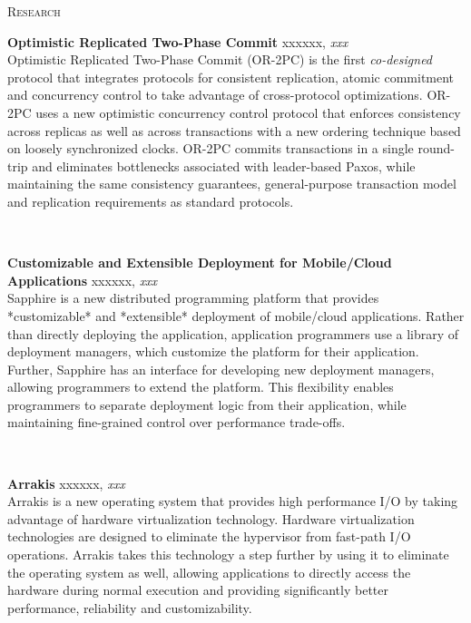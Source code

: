 \documentclass[10pt,times]{report}
\newlength{\sectiongap}
\newlength{\entrygap}
\newlength{\sectioncolwidth}
\newlength{\colgap}
\newlength{\stuffwidth}
\def\ifEqString#1#2{\def\testa{#1}\def\testb{#2}%
  \ifx\testa\testb}
\newenvironment{rtable}{
  \begin{minipage}{\textwidth}
  }{
  \end{minipage}
}
\newenvironment{rentry}[3][xxx]{
  \begin{minipage}[t]{\hsize}
    \textbf{#2}\ifEqString{#1}{xxx}\relax\else, \textit{#1}\fi
    \hspace{\stretch{1}} #3 \\
  }{
    \removelastskip
  \end{minipage}
  \\[\entrygap]  %
}
\newenvironment{rsection}[1]{
  \begin{minipage}[t]{\sectioncolwidth}
    \textsc{#1}
  \end{minipage}
  \hspace{\colgap}
  \begin{minipage}[t]{\stuffwidth}
  }{
    \removelastskip
  \end{minipage}
  \\[\sectiongap]
}
\begin{document}
\begin{rtable}
  \begin{rsection}{Research}
    \begin{rentry}{Optimistic Replicated Two-Phase Commit}{}
      Optimistic Replicated Two-Phase Commit (OR-2PC) is the first
      \emph{co-designed} protocol that integrates protocols for
      consistent replication, atomic commitment and concurrency
      control to take advantage of cross-protocol
      optimizations. OR-2PC uses a new optimistic concurrency control
      protocol that enforces consistency across replicas as well as
      across transactions with a new ordering technique based on
      loosely synchronized clocks. OR-2PC commits transactions in a
      single round-trip and eliminates bottlenecks associated with
      leader-based Paxos, while maintaining the same consistency
      guarantees, general-purpose transaction model and replication
      requirements as standard protocols.
    \end{rentry}

    \begin{rentry}{Customizable and Extensible Deployment for
        Mobile/Cloud Applications}{}
      Sapphire is a new distributed programming platform that provides
      *customizable* and *extensible* deployment of mobile/cloud
      applications. Rather than directly deploying the application,
      application programmers use a library of deployment managers,
      which customize the platform for their application. Further,
      Sapphire has an interface for developing new deployment
      managers, allowing programmers to extend the platform. This
      flexibility enables programmers to separate deployment logic
      from their application, while maintaining fine-grained control
      over performance trade-offs.
    \end{rentry}

    \begin{rentry}{Arrakis}{}
      Arrakis is a new operating system that provides high performance
      I/O by taking advantage of hardware virtualization
      technology. Hardware virtualization technologies are designed to
      eliminate the hypervisor from fast-path I/O operations. Arrakis
      takes this technology a step further by using it to eliminate
      the operating system as well, allowing applications to directly
      access the hardware during normal execution and providing
      significantly better performance, reliability and
      customizability.
    \end{rentry}


\end{rsection}
\end{rtable}
\end{document}
